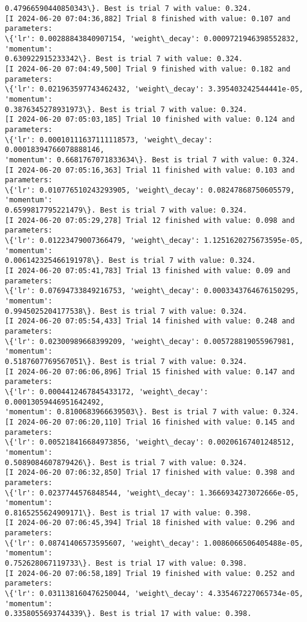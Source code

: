 \documentclass[11pt]{article}
\begin{document}
\begin{Verbatim}[commandchars=\\\{\}]
0.47966590440850343\}. Best is trial 7 with value: 0.324.
[I 2024-06-20 07:04:36,882] Trial 8 finished with value: 0.107 and parameters:
\{'lr': 0.00288843840907154, 'weight\_decay': 0.0009721946398552832, 'momentum':
0.630922915233342\}. Best is trial 7 with value: 0.324.
[I 2024-06-20 07:04:49,500] Trial 9 finished with value: 0.182 and parameters:
\{'lr': 0.021963597743462432, 'weight\_decay': 3.395403242544441e-05, 'momentum':
0.3876345278931973\}. Best is trial 7 with value: 0.324.
[I 2024-06-20 07:05:03,185] Trial 10 finished with value: 0.124 and parameters:
\{'lr': 0.00010111637111118573, 'weight\_decay': 0.00018394766078888146,
'momentum': 0.6681767071833634\}. Best is trial 7 with value: 0.324.
[I 2024-06-20 07:05:16,363] Trial 11 finished with value: 0.103 and parameters:
\{'lr': 0.010776510243293905, 'weight\_decay': 0.08247868750605579, 'momentum':
0.6599817795221479\}. Best is trial 7 with value: 0.324.
[I 2024-06-20 07:05:29,278] Trial 12 finished with value: 0.098 and parameters:
\{'lr': 0.01223479007366479, 'weight\_decay': 1.1251620275673595e-05, 'momentum':
0.006142325466191978\}. Best is trial 7 with value: 0.324.
[I 2024-06-20 07:05:41,783] Trial 13 finished with value: 0.09 and parameters:
\{'lr': 0.07694733849216753, 'weight\_decay': 0.0003343764676150295, 'momentum':
0.9945025204177538\}. Best is trial 7 with value: 0.324.
[I 2024-06-20 07:05:54,433] Trial 14 finished with value: 0.248 and parameters:
\{'lr': 0.02300989668399209, 'weight\_decay': 0.005728819055967981, 'momentum':
0.5187607769567051\}. Best is trial 7 with value: 0.324.
[I 2024-06-20 07:06:06,896] Trial 15 finished with value: 0.147 and parameters:
\{'lr': 0.0004412467845433172, 'weight\_decay': 0.00013059446951642492,
'momentum': 0.8100683966639503\}. Best is trial 7 with value: 0.324.
[I 2024-06-20 07:06:20,110] Trial 16 finished with value: 0.145 and parameters:
\{'lr': 0.005218416684973856, 'weight\_decay': 0.00206167401248512, 'momentum':
0.5089084607879426\}. Best is trial 7 with value: 0.324.
[I 2024-06-20 07:06:32,850] Trial 17 finished with value: 0.398 and parameters:
\{'lr': 0.0237744576848544, 'weight\_decay': 1.3666934273072666e-05, 'momentum':
0.8165255624909171\}. Best is trial 17 with value: 0.398.
[I 2024-06-20 07:06:45,394] Trial 18 finished with value: 0.296 and parameters:
\{'lr': 0.08741406573595607, 'weight\_decay': 1.0086066506405488e-05, 'momentum':
0.752628067119733\}. Best is trial 17 with value: 0.398.
[I 2024-06-20 07:06:58,189] Trial 19 finished with value: 0.252 and parameters:
\{'lr': 0.031138160476250044, 'weight\_decay': 4.335467227065734e-05, 'momentum':
0.3358055693744339\}. Best is trial 17 with value: 0.398.
    \end{Verbatim}
\end{document}
